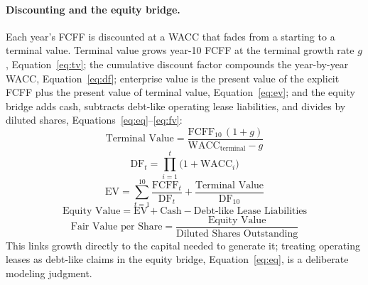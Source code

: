 \documentclass[a4paper]{CSMakotoTechnicalReport}
\begin{document}
\paragraph{Discounting and the equity bridge.} Each year's FCFF is discounted at a WACC that fades from a starting to a terminal value. Terminal value grows year-10 FCFF at the terminal growth rate $g$, Equation~\eqref{eq:tv}; the cumulative discount factor compounds the year-by-year WACC, Equation~\eqref{eq:df}; enterprise value is the present value of the explicit FCFF plus the present value of terminal value, Equation~\eqref{eq:ev}; and the equity bridge adds cash, subtracts debt-like operating lease liabilities, and divides by diluted shares, Equations~\eqref{eq:eq}--\eqref{eq:fv}:
\begin{equation}
\text{Terminal Value} = \frac{\text{FCFF}_{10}\,(1+g)}{\text{WACC}_{\text{terminal}} - g} \label{eq:tv}
\end{equation}
\begin{equation}
\text{DF}_t = \prod_{i=1}^{t}\bigl(1+\text{WACC}_i\bigr) \label{eq:df}
\end{equation}
\begin{equation}
\text{EV} = \sum_{t=1}^{10}\frac{\text{FCFF}_t}{\text{DF}_t} + \frac{\text{Terminal Value}}{\text{DF}_{10}} \label{eq:ev}
\end{equation}
\begin{equation}
\text{Equity Value} = \text{EV} + \text{Cash} - \text{Debt-like Lease Liabilities} \label{eq:eq}
\end{equation}
\begin{equation}
\text{Fair Value per Share} = \frac{\text{Equity Value}}{\text{Diluted Shares Outstanding}} \label{eq:fv}
\end{equation}
This links growth directly to the capital needed to generate it; treating operating leases as debt-like claims in the equity bridge, Equation~\eqref{eq:eq}, is a deliberate modeling judgment.
\end{document}
